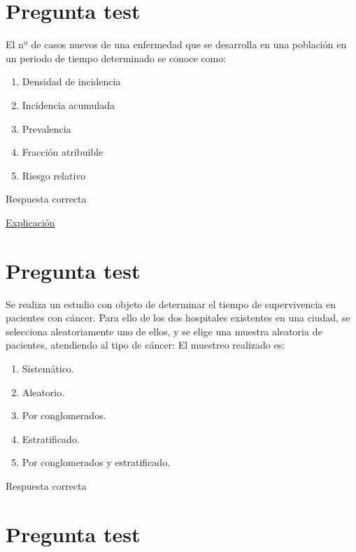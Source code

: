 \documentclass[
]{book}
\providecommand{\tightlist}{%
  \setlength{\itemsep}{0pt}\setlength{\parskip}{0pt}}
\begin{document}
\hypertarget{pregunta-test-9}{%
\section{Pregunta test}\label{pregunta-test-9}}

El nº de casos nuevos de una enfermedad que se desarrolla en una población en un periodo de tiempo determinado se conoce como:

\begin{enumerate}
\def\labelenumi{\alph{enumi})}
\tightlist
\item
  Densidad de incidencia
\item
  Incidencia acumulada
\item
  Prevalencia
\item
  Fracción atribuible
\item
  Riesgo relativo
\end{enumerate}

Respuesta correcta

\href{https://www.conprueba.es/glosario/incidencia-acumulada}{Explicación}

\hypertarget{pregunta-test-10}{%
\section{Pregunta test}\label{pregunta-test-10}}

Se realiza un estudio con objeto de determinar el tiempo de supervivencia en pacientes con cáncer. Para ello de los dos hospitales existentes en una ciudad, se selecciona aleatoriamente uno de ellos, y se elige una muestra aleatoria de pacientes, atendiendo al tipo de cáncer: El muestreo realizado es:

\begin{enumerate}
\def\labelenumi{\alph{enumi})}
\tightlist
\item
  Sistemático.
\item
  Aleatorio.
\item
  Por conglomerados.
\item
  Estratificado.
\item
  Por conglomerados y estratificado.
\end{enumerate}

Respuesta correcta

\hypertarget{pregunta-test-11}{%
\section{Pregunta test}\label{pregunta-test-11}}
\end{document}
